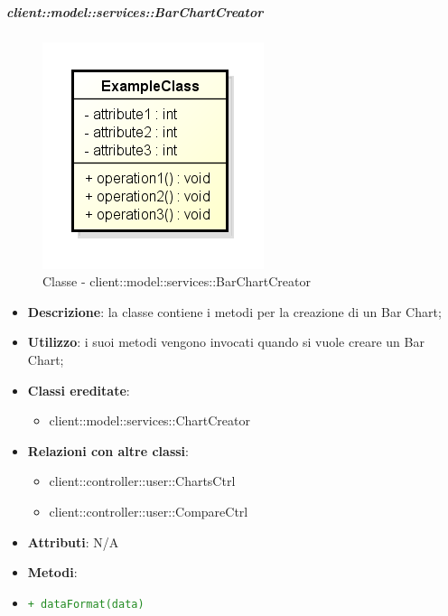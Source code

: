 		\subparagraph{client::model::services::BarChartCreator} %
		\label{subp:barchartcreator}
			\begin{figure}[htbp]
				\centering
				\centerline{\includegraphics[scale=0.7]{./images/client/classes/example_class.png}}
				\caption{Classe - client::model::services::BarChartCreator}
			\end{figure}
			\begin{itemize}
				\item \textbf{Descrizione}: la classe contiene i metodi per la creazione di un Bar Chart;
				\item \textbf{Utilizzo}: i suoi metodi vengono invocati quando si vuole creare un Bar Chart;
				\item \textbf{Classi ereditate}:
					\begin{itemize}
						\item client::model::services::ChartCreator
					\end{itemize}
				\item \textbf{Relazioni con altre classi}:
					\begin{itemize}
						\item client::controller::user::ChartsCtrl
						\item client::controller::user::CompareCtrl
					\end{itemize}
				\item \textbf{Attributi}: N/A
				\item \textbf{Metodi}: 
					\item \textcolor{forestgreen}{\texttt{+ dataFormat(data)}}
			\end{itemize}

